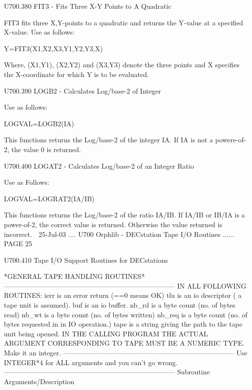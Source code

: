  
 
   U700.380  FIT3  -  Fits Three X-Y Points to A Quadratic
 
   FIT3  fits  three  X,Y-points  to  a quadratic and returns the Y-value at a
   specified X-value. Use as follows:
 
          Y=FIT3(X1,X2,X3,Y1,Y2,Y3,X)
 
   Where,  (X1,Y1),  (X2,Y2)  and  (X3,Y3)  denote  the  three  points  and  X
   specifies the X-coordinate for which Y is to be evaluated.
 
 
 
   U700.390  LOGB2  -  Calculates Log/base-2 of Integer
 
   Use as follows:
 
          LOGVAL=LOGB2(IA)
 
   This  functions  returns  the  Log/base-2 of the integer IA. If IA is not a
   powere-of-2, the value 0 is returned.
 
 
 
   U700.400  LOGAT2  -  Calculates Log/base-2 of an Integer Ratio
 
   Use as Follows:
 
         LOGVAL=LOGRAT2(IA/IB)
 
   This functions returns the Log/base-2 of  the  ratio  IA/IB.  If  IA/IB  or
   IB/IA  is  a power-of-2, the correct value is returned. Otherwise the value
   returned is incorrect.
    
   25-Jul-03 .... U700  Orphlib - DECstation Tape I/O Routines ...... PAGE  25
 
 
   U700.410  Tape I/O Support Routines for DECstations
 
   *GENERAL TAPE HANDLING ROUTINES*
   ---------------------------------------------------------------------------
   IN ALL FOLLOWING ROUTINES:
   ierr   is an error return (==0 means OK)
   tlu    is an io descriptor ( a tape unit is assumed).
   buf    is an io buffer.
   nb_rd  is a byte count (no. of bytes read)
   nb_wt  is a byte count (no. of bytes written)
   nb_req is a byte count (no. of bytes requested in in IO operation.)
   tape   is a string giving the path to the tape unit being opened.
          IN THE CALLING PROGRAM THE ACTUAL ARGUMENT CORRESPONDING TO
          TAPE MUST BE A NUMERIC TYPE. Make it an integer.
   ---------------------------------------------------------------------------
   Use INTEGER*4 for ALL arguments and you can't go wrong.
   ---------------------------------------------------------------------------
   Subroutine          Arguments/Description
 
